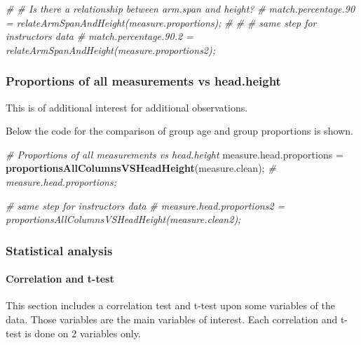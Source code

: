 \documentclass[]{article}
\newenvironment{Shaded}{\begin{snugshade}}{\end{snugshade}}
\newcommand{\CommentTok}[1]{\textcolor[rgb]{0.56,0.35,0.01}{\textit{#1}}}
\newcommand{\KeywordTok}[1]{\textcolor[rgb]{0.13,0.29,0.53}{\textbf{#1}}}
\newcommand{\NormalTok}[1]{#1}
\newcommand{\StringTok}[1]{\textcolor[rgb]{0.31,0.60,0.02}{#1}}
\begin{document}
\begin{Shaded}
\begin{Highlighting}[]
\CommentTok{\# \# Is there a relationship between arm.span and height?}
\CommentTok{\# match.percentage.90 = relateArmSpanAndHeight(measure.proportions);}
\CommentTok{\# }
\CommentTok{\# \# same step for instructors data}
\CommentTok{\# match.percentage.90.2 = relateArmSpanAndHeight(measure.proportions2);}
\end{Highlighting}
\end{Shaded}

\newpage

\subsubsection{Proportions of all measurements vs head.height}
\label{sec:appendix-proportions}

This is of additional interest for additional observations.

Below the code for the comparison of group age and group proportions is
shown.

\begin{Shaded}
\begin{Highlighting}[]
\CommentTok{\# Proportions of all measurements vs head.height}
\NormalTok{measure.head.proportions =}\StringTok{ }\KeywordTok{proportionsAllColumnsVSHeadHeight}\NormalTok{(measure.clean);}
\CommentTok{\# measure.head.proportions;}

\CommentTok{\# same step for instructors data}
\CommentTok{\# measure.head.proportions2 = proportionsAllColumnsVSHeadHeight(measure.clean2);}
\end{Highlighting}
\end{Shaded}

\newpage

\subsubsection{Statistical analysis}
\label{sec:appendix-statistical-analysis}

\paragraph{Correlation and t-test}
\label{sec:appendix-correlation-and-ttest}

This section includes a correlation test and t-test upon some variables
of the data. Those variables are the main variables of interest. Each
correlation and t-test is done on 2 variables only.
\end{document}
